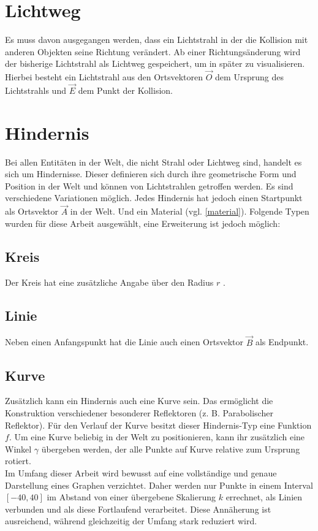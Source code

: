 \section{Lichtweg}
Es muss davon ausgegangen werden, dass ein Lichtstrahl in der 
die Kollision mit anderen Objekten seine Richtung verändert. 
Ab einer Richtungsänderung wird der bisherige Lichtstrahl als Lichtweg  
gespeichert, um in später zu visualisieren.
Hierbei besteht ein Lichtstrahl aus den Ortsvektoren $ \vec{O} $  dem 
Ursprung des Lichtstrahls und $ \vec{E} $  dem Punkt der Kollision.

\section{Hindernis}
Bei allen Entitäten in der Welt, die nicht Strahl oder Lichtweg sind, 
handelt es sich um Hindernisse. 
Dieser definieren sich durch ihre geometrische Form und Position in der Welt 
und können von Lichtstrahlen getroffen werden.
Es sind verschiedene Variationen möglich. Jedes Hindernis  
hat jedoch einen Startpunkt als Ortsvektor $ \vec{A} $  in der Welt. 
Und ein Material  (vgl. \ref{material}). 
Folgende Typen wurden für diese Arbeit ausgewählt, eine Erweiterung ist jedoch möglich: 

\subsection{Kreis}
Der Kreis  hat eine zusätzliche Angabe über den Radius $ r $ .

\subsection{Linie}
Neben einen Anfangspunkt hat die Linie  auch einen Ortsvektor $ \vec{B} $ als Endpunkt. 

\subsection{Kurve}
Zusätzlich kann ein Hindernis auch eine Kurve  sein. 
Das ermöglicht die Konstruktion verschiedener besonderer Reflektoren (z. B. Parabolischer Reflektor).
Für den Verlauf der Kurve besitzt dieser Hindernis-Typ eine Funktion $ f $. 
Um eine Kurve beliebig in der Welt zu positionieren, kann ihr zusätzlich eine Winkel $ \gamma $  übergeben werden, 
der alle Punkte auf Kurve relative zum Ursprung rotiert. \\
Im Umfang dieser Arbeit wird bewusst auf eine vollständige und genaue Darstellung eines Graphen verzichtet. 
Daher werden nur Punkte in einem Interval $ [-40, 40] $ im Abstand von einer übergebene Skalierung $ k $  errechnet, 
als Linien verbunden und als diese Fortlaufend verarbeitet. 
Diese Annäherung ist ausreichend, während gleichzeitig der Umfang stark reduziert wird.



